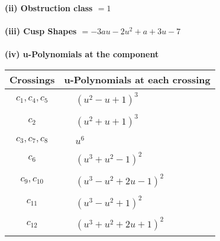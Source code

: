 \documentclass[1p]{elsarticle_modified}
\theoremstyle{definition}
\begin{document}
\flushleft \textbf{(ii) Obstruction class $= 1$}\\~\\
\flushleft \textbf{(iii) Cusp Shapes $= -3 a u-2 u^2+a+3 u-7$}\\~\\
\newpage\renewcommand{\arraystretch}{1}
\flushleft \textbf{(iv) u-Polynomials at the component}\newline \\
\begin{tabular}{m{50pt}|m{274pt}}
Crossings & \hspace{64pt}u-Polynomials at each crossing \\
\hline $$\begin{aligned}c_{1},c_{4},c_{5}\end{aligned}$$&$\begin{aligned}
&(u^2- u+1)^3
\end{aligned}$\\
\hline $$\begin{aligned}c_{2}\end{aligned}$$&$\begin{aligned}
&(u^2+u+1)^3
\end{aligned}$\\
\hline $$\begin{aligned}c_{3},c_{7},c_{8}\end{aligned}$$&$\begin{aligned}
&u^6
\end{aligned}$\\
\hline $$\begin{aligned}c_{6}\end{aligned}$$&$\begin{aligned}
&(u^3+u^2-1)^2
\end{aligned}$\\
\hline $$\begin{aligned}c_{9},c_{10}\end{aligned}$$&$\begin{aligned}
&(u^3- u^2+2 u-1)^2
\end{aligned}$\\
\hline $$\begin{aligned}c_{11}\end{aligned}$$&$\begin{aligned}
&(u^3- u^2+1)^2
\end{aligned}$\\
\hline $$\begin{aligned}c_{12}\end{aligned}$$&$\begin{aligned}
&(u^3+u^2+2 u+1)^2
\end{aligned}$\\
\hline
\end{tabular}\\~\\
\end{document}
